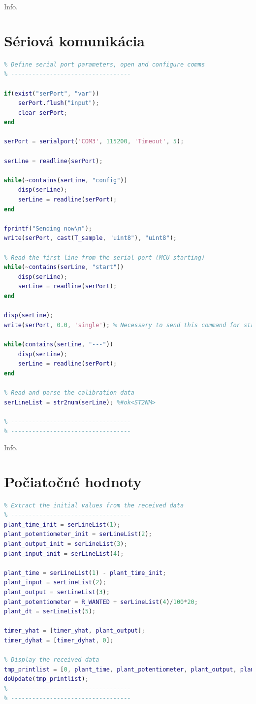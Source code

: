 \documentclass[a4paper, 10pt, ]{article}
\begin{document}
Info.

\section{Sériová komunikácia}
\begin{lstlisting}[caption=Inicializácia sériovej komunikácie a konfigurácia., label={code:init_serial}, language=Matlab]
% ----------------------------------
% Define serial port parameters, open and configure comms
% ----------------------------------

if(exist("serPort", "var"))
    serPort.flush("input");
    clear serPort;
end

serPort = serialport('COM3', 115200, 'Timeout', 5);

serLine = readline(serPort);

while(~contains(serLine, "config"))
    disp(serLine);
    serLine = readline(serPort);
end

fprintf("Sending now\n");
write(serPort, cast(T_sample, "uint8"), "uint8");

% Read the first line from the serial port (MCU starting)
while(~contains(serLine, "start"))
    disp(serLine);
    serLine = readline(serPort);
end

disp(serLine);
write(serPort, 0.0, 'single'); % Necessary to send this command for stable sampling period

while(contains(serLine, "---"))
    disp(serLine);
    serLine = readline(serPort);
end

% Read and parse the calibration data
serLineList = str2num(serLine); %#ok<ST2NM>

% ----------------------------------
% ----------------------------------
\end{lstlisting}

Info.

\section{Počiatočné hodnoty}
\begin{lstlisting}[caption=Zaznamenanie počiatočných hodnôt., label={code:init_values}, language=Matlab]
% ----------------------------------
% Extract the initial values from the received data
% ----------------------------------
plant_time_init = serLineList(1);
plant_potentiometer_init = serLineList(2);
plant_output_init = serLineList(3);
plant_input_init = serLineList(4);

plant_time = serLineList(1) - plant_time_init;
plant_input = serLineList(2);
plant_output = serLineList(3);
plant_potentiometer = R_WANTED + serLineList(4)/100*20;
plant_dt = serLineList(5);

timer_yhat = [timer_yhat, plant_output];
timer_dyhat = [timer_dyhat, 0];

% Display the received data
tmp_printlist = [0, plant_time, plant_potentiometer, plant_output, plant_input, plant_dt, T_sample];
doUpdate(tmp_printlist);
% ----------------------------------
% ----------------------------------
\end{lstlisting}
\end{document}
